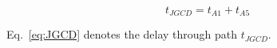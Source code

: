 \begin{equation}\label{eq:JGCD}
    t_{JGCD} =  t_{A1} + t_{A5}
\end{equation}

Eq.~\ref{eq:JGCD} denotes the delay through path $t_{JGCD}$.